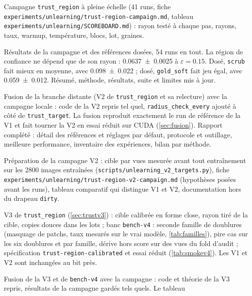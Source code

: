 \documentclass[11pt,a4paper]{article}
\newcommand{\code}[1]{\texttt{#1}}
\newcommand{\chemin}[1]{\nolinkurl{#1}}%
\begin{document}
\begin{description}[leftmargin=1.2em,font=\sffamily\bfseries\color{bleu}]
  \item[21 novembre 2026, nuit, campagne] Campagne \code{trust\_region} à pleine échelle (41 runs,
    fiche \chemin{experiments/unlearning/trust-region-campaign.md}, tableau
    \chemin{experiments/unlearning/SCOREBOARD.md}) : rayon testé à chaque pas, rayons, taux,
    warmup, température, blocs, lot, graines.
  \item[21 novembre 2026, nuit, bilan] Résultats de la campagne et des références dosées, 54 runs
    en tout. La région de confiance ne dépend que de son rayon : \num{0.0637 +- 0.0025} à
    $\varepsilon=\num{0.15}$. Dosé, \code{scrub} fait mieux en moyenne, avec
    \num{0.098 +- 0.022} ; dosé, \code{gold\_soft} fait jeu égal, avec \num{0.059 +- 0.012}.
    Résumé, méthode, résultats, suite et limites mis à jour.
  \item[21 novembre 2026, fusion] Fusion de la branche distante (V2 de \code{trust\_region} et sa
    relecture) avec la campagne locale : code de la V2 repris tel quel, \code{radius\_check\_every}
    ajouté à côté de \code{trust\_target}. La fusion reproduit exactement le run de référence de la
    V1 et fait tourner la V2 en essai réduit sur CUDA (\cref{sec:fusion}). Rapport complété :
    détail des références et réglages par défaut, protocole et outillage, meilleure performance,
    inventaire des expériences, bilan par méthode.
  \item[21 novembre 2026, nuit, campagne V2] Préparation de la campagne V2 : cible par vues
    mesurée avant tout entraînement sur les 2800 images entraînées (\chemin{scripts/unlearning\_v2\_targets.py}),
    fiche \chemin{experiments/unlearning/trust-region-v2-campaign.md} (hypothèses posées avant les
    runs), tableau comparatif qui distingue V1 et V2, documentation hors du drapeau \code{dirty}.
  \item[21 novembre 2026, nuit, V3] V3 de \code{trust\_region} (\cref{sec:trustv3}) : cible
    calibrée en forme close, rayon tiré de la cible, copies douces dans les lots ; banc
    \code{bench-v4} : seconde famille de doublures (masquage de patchs, taux mesurés sur le vrai
    modèle, \cref{tab:familles}), pire cas sur les six doublures et par famille, dérive hors score
    sur des vues du fold d'audit ; spécification \code{trust-region-calibrated} et essai réduit
    (\cref{tab:smokev4}). Les V1 et V2 sont inchangées au bit près.
  \item[21 novembre 2026, seconde fusion] Fusion de la V3 et de \code{bench-v4} avec la campagne :
    code et théorie de la V3 repris, résultats de la campagne gardés tels quels. Le tableau

\end{description}
\end{document}
